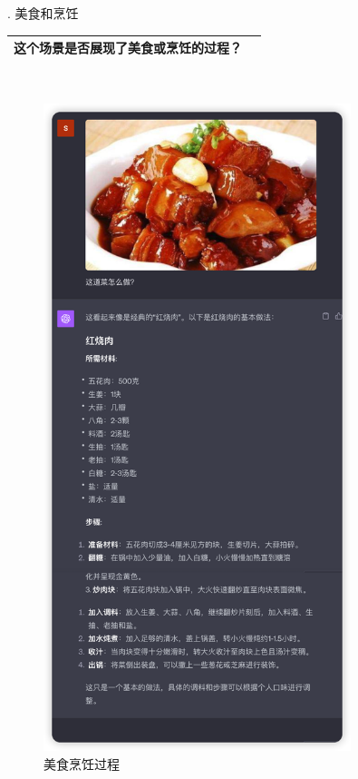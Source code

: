\documentclass[12pt]{book}
\begin{document}
. 美食和烹饪

\begin{tabular}{|p{15cm}|p{3cm}|}
	\hline
这个场景是否展现了美食或烹饪的过程？\\
	\hline
\end{tabular}\\

	\begin{figure}[htbp]
	\centering
	\includegraphics[width=0.8\textwidth]{image/4.png}
	\caption{美食烹饪过程}
	\label{fig:myImage}
	\end{figure}
\end{document}
